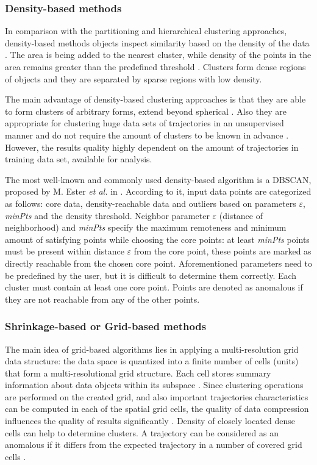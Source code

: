 \subsubsection{Density-based methods}

In comparison with the partitioning and hierarchical clustering approaches, density-based methods objects inspect similarity based on the density of the data \cite{article:22_survey_dscc}. The area is being added to the nearest cluster, while density of the points in the area remains greater than the predefined threshold \cite{article:8_review_mot_cl_alg}. Clusters form dense regions of objects and they are separated by sparse regions with low density.

The main advantage of density-based clustering approaches is that they are able to form clusters of arbitrary forms, extend beyond spherical \cite{article:8_review_mot_cl_alg}. Also they are appropriate for clustering huge data sets of trajectories in an unsupervised manner and do not require the amount of clusters to be known in advance \cite{article:5_survey_tbsa}\cite{article:22_survey_dscc}. However, the results quality highly dependent on the amount of trajectories in training data set, available for analysis.

The most well-known and commonly used density-based algorithm is a DBSCAN, proposed by M. Ester \textit{et al.} in \cite{inproceedings:20_dbscan}. According to it, input data points are categorized as follows: core data, density-reachable data and outliers based on parameters $\varepsilon$, \textit{minPts} and the density threshold. Neighbor parameter $\varepsilon$ (distance of neighborhood) and \textit{minPts} specify the maximum remoteness and minimum amount of satisfying points while choosing the core points: at least \textit{minPts} points must be present within distance $\varepsilon$ from the core point, these points are marked as directly reachable from the chosen core point. Aforementioned parameters need to be predefined by the user, but it is difficult to determine them correctly. Each cluster must contain at least one core point. Points are denoted as anomalous if they are not reachable from any of the other points.

\subsubsection{Shrinkage-based or Grid-based methods}

The main idea of grid-based algorithms lies in applying a multi-resolution grid data structure: the data space is quantized into a finite number of cells (units) that form a multi-resolutional grid structure. Each cell stores summary information about data objects within its subspace \cite{article:22_survey_dscc}. Since clustering operations are performed on the created grid, and also important trajectories characteristics can be computed in each of the spatial grid cells, the quality of data compression influences the quality of results significantly \cite{article:1_survey_stdm}. Density of closely located dense cells can help to determine clusters. A trajectory can be considered as an anomalous if it differs from the expected trajectory in a number of covered grid cells \cite{article:22_survey_dscc}.

